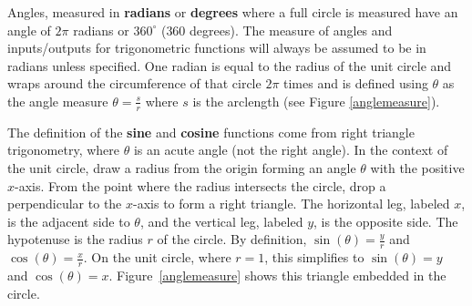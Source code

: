         \medskip

        Angles, measured in \textbf{radians} or \textbf{degrees} where a full circle is measured have an angle of $2\pi$ radians or $360^\circ$ ($360$ degrees). The measure of angles and inputs/outputs for trigonometric functions will always be assumed to be in radians unless specified. One radian is equal to the radius of the unit circle and wraps around the circumference of that circle $2\pi$ times and is defined using $\theta$ as the angle measure $\theta = \frac{s}{r}$ where $s$ is the arclength (see Figure \ref{anglemeasure}).

        \medskip

        The definition of the \textbf{sine} and \textbf{cosine} functions come from right triangle trigonometry, where $\theta$ is an acute angle (not the right angle). In the context of the unit circle, draw a radius from the origin forming an angle $\theta$ with the positive $x$-axis. From the point where the radius intersects the circle, drop a perpendicular to the $x$-axis to form a right triangle. The horizontal leg, labeled $x$, is the adjacent side to $\theta$, and the vertical leg, labeled $y$, is the opposite side. The hypotenuse is the radius $r$ of the circle. By definition, $\sin(\theta) = \frac{y}{r}$ and $\cos(\theta) = \frac{x}{r}$. On the unit circle, where $r = 1$, this simplifies to $\sin(\theta) = y$ and $\cos(\theta) = x$. Figure~\ref{anglemeasure} shows this triangle embedded in the circle.

        \medskip

